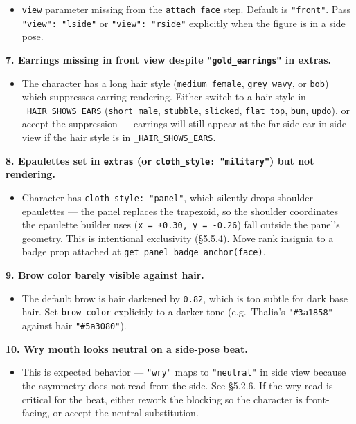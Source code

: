 \documentclass[
  11pt,
]{book}
\providecommand{\tightlist}{%
  \setlength{\itemsep}{0pt}\setlength{\parskip}{0pt}}
\begin{document}
\begin{itemize}
\tightlist
\item
  \texttt{view} parameter missing from the \texttt{attach\_face} step.
  Default is \texttt{"front"}. Pass \texttt{"view":\ "lside"} or
  \texttt{"view":\ "rside"} explicitly when the figure is in a side
  pose.
\end{itemize}

\textbf{7. Earrings missing in front view despite
\texttt{"gold\_earrings"} in extras.}

\begin{itemize}
\tightlist
\item
  The character has a long hair style (\texttt{medium\_female},
  \texttt{grey\_wavy}, or \texttt{bob}) which suppresses earring
  rendering. Either switch to a hair style in
  \texttt{\_HAIR\_SHOWS\_EARS} (\texttt{short\_male}, \texttt{stubble},
  \texttt{slicked}, \texttt{flat\_top}, \texttt{bun}, \texttt{updo}), or
  accept the suppression --- earrings will still appear at the far-side
  ear in side view if the hair style is in \texttt{\_HAIR\_SHOWS\_EARS}.
\end{itemize}

\textbf{8. Epaulettes set in \texttt{extras} (or
\texttt{cloth\_style:\ "military"}) but not rendering.}

\begin{itemize}
\tightlist
\item
  Character has \texttt{cloth\_style:\ "panel"}, which silently drops
  shoulder epaulettes --- the panel replaces the trapezoid, so the
  shoulder coordinates the epaulette builder uses
  (\texttt{x\ =\ ±0.30,\ y\ =\ -0.26}) fall outside the panel's
  geometry. This is intentional exclusivity (§5.5.4). Move rank insignia
  to a badge prop attached at \texttt{get\_panel\_badge\_anchor(face)}.
\end{itemize}

\textbf{9. Brow color barely visible against hair.}

\begin{itemize}
\tightlist
\item
  The default brow is hair darkened by \texttt{0.82}, which is too
  subtle for dark base hair. Set \texttt{brow\_color} explicitly to a
  darker tone (e.g.~Thalia's \texttt{"\#3a1858"} against hair
  \texttt{"\#5a3080"}).
\end{itemize}

\textbf{10. Wry mouth looks neutral on a side-pose beat.}

\begin{itemize}
\tightlist
\item
  This is expected behavior --- \texttt{"wry"} maps to
  \texttt{"neutral"} in side view because the asymmetry does not read
  from the side. See §5.2.6. If the wry read is critical for the beat,
  either rework the blocking so the character is front-facing, or accept
  the neutral substitution.
\end{itemize}
\end{document}
